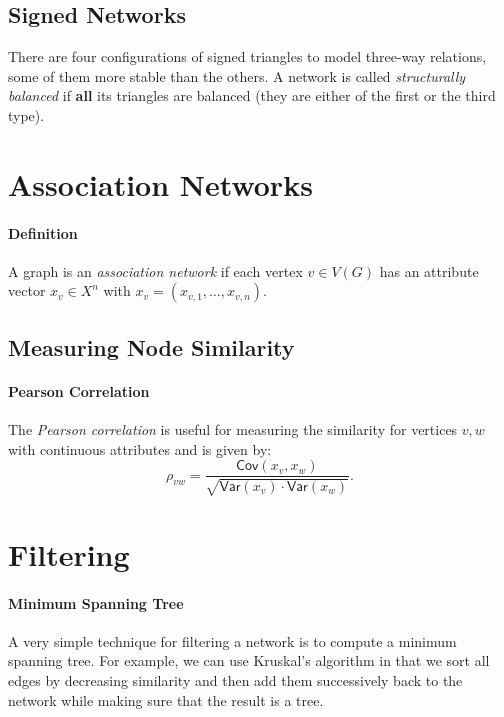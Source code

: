 \documentclass[english]{panikzettel}
\begin{document}


\subsection{Signed Networks}

There are four configurations of signed triangles to model three-way relations, some of them more stable than the others.
A network is called \textit{structurally balanced} if \textbf{all} its triangles are balanced (they are either of the first or the third type).



\section{Association Networks}

\paragraph{Definition}
A graph is an \textit{association network} if each vertex $v \in V(G)$ has an attribute vector $x_v \in X^n$ with $x_v = (x_{v,1},\dots,x_{v,n})$.

\subsection{Measuring Node Similarity}

\paragraph{Pearson Correlation}
The \textit{Pearson correlation} is useful for measuring the similarity for vertices $v,w$ with continuous attributes and is given by:
\[
    \rho_{vw} = \frac{\textsf{Cov}(x_v,x_w)}{\sqrt{\textsf{Var}(x_v)\cdot\textsf{Var}(x_w)}}.
\]

\section{Filtering}

\paragraph{Minimum Spanning Tree}
A very simple technique for filtering a network is to compute a minimum spanning tree.
For example, we can use Kruskal's algorithm in that we sort all edges by decreasing similarity and then add them successively back to the network while making sure that the result is a tree.
\end{document}
